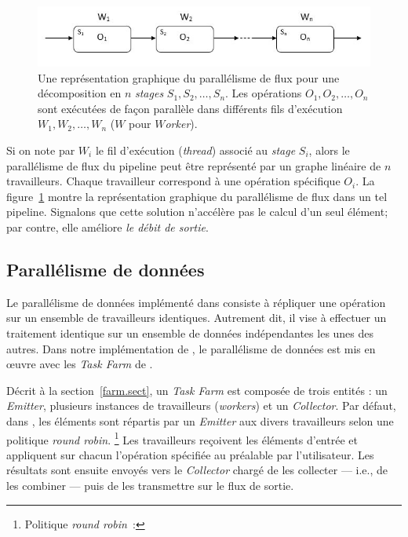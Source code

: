 \begin{figure}
\centering
     \includegraphics[width=1.0\textwidth]{Figures/ParallelismeDuFlux.jpg}
      \caption[Une repr\'esentation graphique du parall\'elisme de flux en \ppff.]{Une repr\'esentation graphique du parall\'elisme de flux pour une d\'ecomposition en $n$ \emph{stages} $S_1, S_2, \ldots, S_n$. Les op\'erations $O_1, O_2, \ldots, O_n$ sont ex\'ecut\'ees de fa\c{c}on parall\`ele dans diff\'erents fils d'ex\'ecution $W_1, W_2, \ldots, W_n$ ($W$ pour \emph{$W$orker}).}
       \label{ParallelismeDuFlux.fig}
\end{figure}


Si on note par $W_i$ le fil d'ex\'ecution (\emph{thread}) associ\'e au \emph{stage} $S_i$, alors
le parall\'elisme de flux du pipeline peut \^etre repr\'esent\'e par un graphe lin\'eaire de $n$ travailleurs. Chaque travailleur correspond \`a une op\'eration sp\'ecifique $O_i$. La figure~\ref{ParallelismeDuFlux.fig} montre la repr\'esentation graphique du parall\'elisme de flux dans un tel pipeline. Signalons que cette solution n'acc\'el\`ere pas le calcul d'un seul \'el\'ement; par contre, elle am\'eliore \emph{le d\'ebit de sortie}.

\subsection{Parall\'elisme de donn\'ees}

Le parall\'elisme de donn\'ees impl\'ement\'e dans   consiste \`a r\'epliquer une op\'eration sur un ensemble de travailleurs identiques. Autrement dit, il vise \`a effectuer un traitement identique sur un ensemble de donn\'ees ind\'ependantes les unes des autres. 
%
Dans notre impl\'ementation de \PpFf, le parall\'elisme de donn\'ees est mis en \oe{}uvre avec les \emph{Task Farm} de .


D\'ecrit \`a la section~\ref{farm.sect}, un \emph{Task Farm} est compos\'ee de trois entit\'es : un \emph{Emitter}, plusieurs instances de travailleurs (\emph{workers}) et un \emph{Collector}. Par d\'efaut, dans \PpFf{}, les \'el\'ements sont r\'epartis par un \emph{Emitter} aux divers travailleurs selon une politique \emph{round robin}.%
%
\footnote{Politique \emph{round robin}~: }
%
Les travailleurs re\c{c}oivent les \'el\'ements d'entr\'ee et appliquent sur chacun l'op\'eration sp\'ecifi\'ee au pr\'ealable par l'utilisateur. Les r\'esultats sont ensuite envoy\'es vers le \emph{Collector} charg\'e de les collecter --- i.e., de les combiner --- puis de les transmettre sur le flux de sortie.

